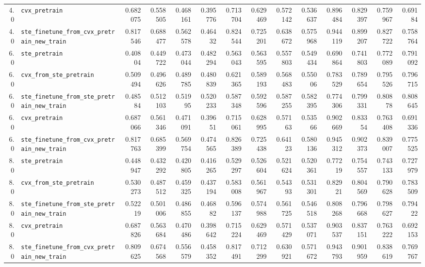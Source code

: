 \begin{longtable}{@{}r l *{12}{r}@{}}
4.0 & \texttt{cvx\_pretrain} & 0.682075 & 0.558505 & 0.468161 & 0.395776 & 0.713704 & 0.629469 & 0.572142 & 0.536637 & 0.896484 & 0.829397 & 0.759967 & 0.69184 \\
4.0 & \texttt{ste\_finetune\_from\_cvx\_pretrain\_new\_train} & 0.817546 & 0.688477 & 0.562578 & 0.46432 & 0.824544 & 0.725201 & 0.638672 & 0.575968 & 0.944119 & 0.899207 & 0.827722 & 0.758764 \\
6.0 & \texttt{ste\_pretrain} & 0.40804 & 0.449722 & 0.473044 & 0.482294 & 0.563043 & 0.563595 & 0.557803 & 0.549434 & 0.690864 & 0.741803 & 0.772089 & 0.791092 \\
6.0 & \texttt{cvx\_from\_ste\_pretrain} & 0.509494 & 0.496626 & 0.489785 & 0.480839 & 0.621365 & 0.589193 & 0.568483 & 0.55006 & 0.783529 & 0.789654 & 0.795526 & 0.796715 \\
6.0 & \texttt{ste\_finetune\_from\_ste\_pretrain\_new\_train} & 0.48584 & 0.512103 & 0.51995 & 0.520233 & 0.587348 & 0.592596 & 0.587255 & 0.582395 & 0.774306 & 0.799331 & 0.80878 & 0.808645 \\
6.0 & \texttt{cvx\_pretrain} & 0.687066 & 0.561346 & 0.471091 & 0.39651 & 0.715061 & 0.628995 & 0.57163 & 0.53566 & 0.902669 & 0.83354 & 0.763408 & 0.691336 \\
6.0 & \texttt{ste\_finetune\_from\_cvx\_pretrain\_new\_train} & 0.817763 & 0.685399 & 0.569754 & 0.474565 & 0.826389 & 0.725438 & 0.64123 & 0.580136 & 0.945312 & 0.902373 & 0.839007 & 0.775525 \\
8.0 & \texttt{ste\_pretrain} & 0.448947 & 0.432292 & 0.420805 & 0.416265 & 0.529297 & 0.526604 & 0.521624 & 0.520361 & 0.77219 & 0.754557 & 0.743133 & 0.727979 \\
8.0 & \texttt{cvx\_from\_ste\_pretrain} & 0.530273 & 0.487512 & 0.459325 & 0.437194 & 0.583008 & 0.561967 & 0.54393 & 0.531301 & 0.82921 & 0.804569 & 0.790628 & 0.783509 \\
8.0 & \texttt{ste\_finetune\_from\_ste\_pretrain\_new\_train} & 0.52219 & 0.501006 & 0.486855 & 0.46882 & 0.596137 & 0.574988 & 0.561725 & 0.546518 & 0.808268 & 0.796668 & 0.798627 & 0.79422 \\
8.0 & \texttt{cvx\_pretrain} & 0.687826 & 0.563684 & 0.470486 & 0.398642 & 0.715224 & 0.629469 & 0.571429 & 0.537071 & 0.903537 & 0.837151 & 0.763222 & 0.692153 \\
8.0 & \texttt{ste\_finetune\_from\_cvx\_pretrain\_new\_train} & 0.809625 & 0.674568 & 0.556579 & 0.458352 & 0.817491 & 0.712299 & 0.630921 & 0.571672 & 0.943793 & 0.901959 & 0.838619 & 0.769767 \\

\end{longtable}
